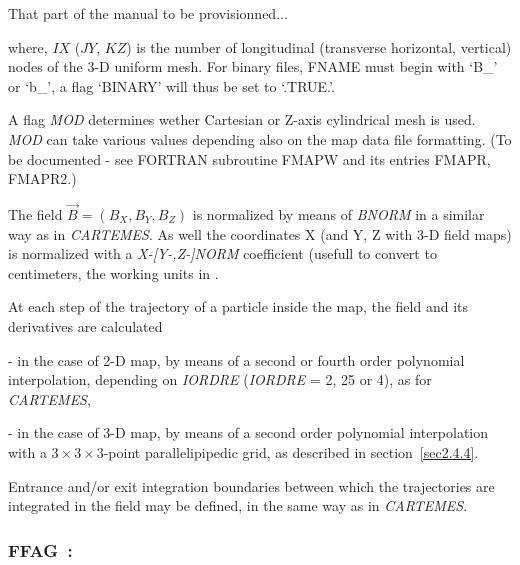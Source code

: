 \bigskip

That part of the manual to be provisionned...

\medskip

\noindent where, $IX$ ($JY$, $KZ$)  is   the number of longitudinal 
(transverse horizontal, vertical) nodes of the 3-D uniform mesh. For binary files, 
FNAME must begin with  \mbox{`B\_'} or  \mbox{`b\_'}, a flag  `BINARY' will thus be set to `.TRUE.'.  

A flag \textsl{MOD} determines wether Cartesian or Z-axis cylindrical mesh is used. \textsl{MOD} can 
take various values depending also on the map data file formatting. (To be documented - see FORTRAN 
subroutine FMAPW and its entries FMAPR, FMAPR2.)

\bigskip

\noindent The field $ \vec  B=(B_X,B_Y,B_Z) $ is normalized by means of 
\textsl{BNORM} in a similar way as in \textsl{CARTEMES}.  
 As well the  coordinates  X (and Y, Z with 3-D field maps) is normalized with 
a  \textsl{X-[Y-,Z-]NORM} coefficient (usefull to convert to centimeters, the working units in  \zgoubi. 


\bigskip

\noindent At each step of the trajectory of a particle inside the map, the
field and its derivatives are calculated 

 - in the case of 2-D map,  by means of a second or fourth order polynomial interpolation, 
depending on \textsl{IORDRE} (\textsl{IORDRE} = 2, 25 or 4), as for 
\textsl{CARTEMES}, 

 - in the case of 3-D map, by means of a second order polynomial interpolation with a 
$3  \times   3   \times   3$-point parallelipipedic grid, as described in 
section~\ref{sec2.4.4}. 
\bigskip

\noindent Entrance and/or exit integration boundaries between which the trajectories
are integrated in the field may be defined, in the same way as in  \textsl{CARTEMES}. 








\newpage


\subsubsection*{FFAG~: \FFAGTitl~\cite{reportNIMFFAG}} \label{FFAG} 
\medskip

